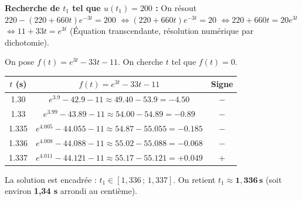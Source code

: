 \documentclass[11pt]{article}
\begin{document}
\begin{exoresolu}
\medskip
\noindent \textbf{Recherche de $t_1$ tel que $u(t_1) = 200$ :}
On résout $220 - (220 + 660 t) e^{-3t} = 200$
$\Leftrightarrow (220 + 660 t) e^{-3t} = 20$
$\Leftrightarrow 220 + 660 t = 20 e^{3t}$
$\Leftrightarrow 11 + 33 t = e^{3t}$ \quad (Équation transcendante, résolution numérique par dichotomie).

On pose $f(t) = e^{3t} - 33t - 11$. On cherche $t$ tel que $f(t)=0$.
\begin{center}
\begin{tabular}{|c|c|c|}\hline
$t$ (s) & $f(t) = e^{3t} - 33t - 11$ & Signe \\ \hline
1.30 & $e^{3.9} - 42.9 - 11 \approx 49.40 - 53.9 = -4.50$ & $-$ \\ \hline
1.33 & $e^{3.99} - 43.89 - 11 \approx 54.00 - 54.89 = -0.89$ & $-$ \\ \hline
1.335 & $e^{4.005} - 44.055 - 11 \approx 54.87 - 55.055 = -0.185$ & $-$ \\ \hline
1.336 & $e^{4.008} - 44.088 - 11 \approx 55.02 - 55.088 = -0.068$ & $-$ \\ \hline
1.337 & $e^{4.011} - 44.121 - 11 \approx 55.17 - 55.121 = +0.049$ & $+$ \\ \hline
\end{tabular}
\end{center}
La solution est encadrée : $t_1 \in [1,336\,;\,1,337]$. On retient $t_1 \approx \mathbf{1,336\,s}$ (soit environ \textbf{1,34 s} arrondi au centième).


\end{exoresolu}
\end{document}
